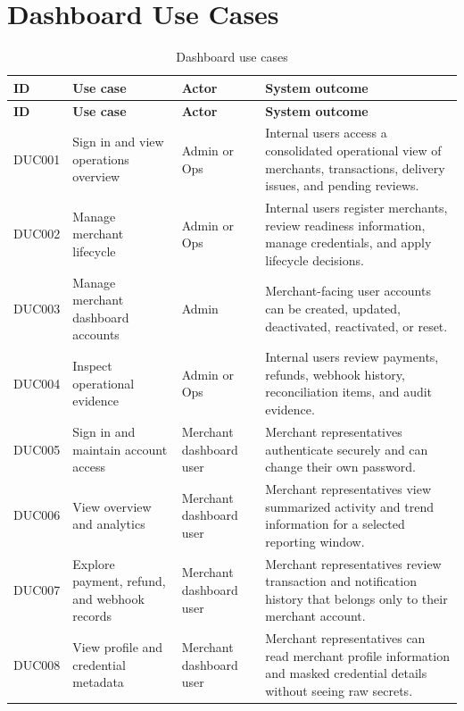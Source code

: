 \section{Dashboard Use Cases}

\begin{longtable}{L{0.11\textwidth}L{0.26\textwidth}L{0.18\textwidth}L{0.27\textwidth}}
\caption{Dashboard use cases}\\
\toprule
\textbf{ID} & \textbf{Use case} & \textbf{Actor} & \textbf{System outcome} \\
\midrule
\endfirsthead
\toprule
\textbf{ID} & \textbf{Use case} & \textbf{Actor} & \textbf{System outcome} \\
\midrule
\endhead
DUC001 & Sign in and view operations overview & Admin or Ops & Internal users access a consolidated operational view of merchants, transactions, delivery issues, and pending reviews. \\
\bodyrowrule
DUC002 & Manage merchant lifecycle & Admin or Ops & Internal users register merchants, review readiness information, manage credentials, and apply lifecycle decisions. \\
\bodyrowrule
DUC003 & Manage merchant dashboard accounts & Admin & Merchant-facing user accounts can be created, updated, deactivated, reactivated, or reset. \\
\bodyrowrule
DUC004 & Inspect operational evidence & Admin or Ops & Internal users review payments, refunds, webhook history, reconciliation items, and audit evidence. \\
\bodyrowrule
DUC005 & Sign in and maintain account access & Merchant dashboard user & Merchant representatives authenticate securely and can change their own password. \\
\bodyrowrule
DUC006 & View overview and analytics & Merchant dashboard user & Merchant representatives view summarized activity and trend information for a selected reporting window. \\
\bodyrowrule
DUC007 & Explore payment, refund, and webhook records & Merchant dashboard user & Merchant representatives review transaction and notification history that belongs only to their merchant account. \\
\bodyrowrule
DUC008 & View profile and credential metadata & Merchant dashboard user & Merchant representatives can read merchant profile information and masked credential details without seeing raw secrets. \\
\bottomrule
\end{longtable}
